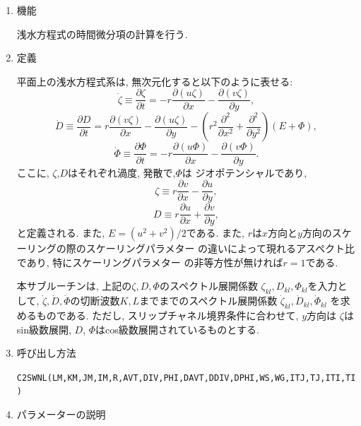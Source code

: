 \documentclass[a4j,fleqn]{jarticle}
\begin{document}
\begin{enumerate}

\item 機能 

浅水方程式の時間微分項の計算を行う.

\item 定義

平面上の浅水方程式系は, 無次元化すると以下のように表せる:
\begin{equation}
\dot{\zeta}\equiv\frac{\partial \zeta}{\partial t}
=-r\frac{\partial(u\zeta)}{\partial x}
 -\frac{\partial(v\zeta)}{\partial y},
\end{equation}
\begin{equation}
\dot{D}\equiv\frac{\partial D}{\partial t}
=r\frac{\partial(v\zeta)}{\partial x}
-\frac{\partial(u\zeta)}{\partial y}
 -\left(r^2\frac{\partial^2}{\partial x^2}
  +\frac{\partial^2}{\partial y^2}\right)(E+\Phi),
\end{equation}
\begin{equation}
\dot{\Phi}\equiv\frac{\partial \Phi}{\partial t}
=-r\frac{\partial(u\Phi)}{\partial x}
-\frac{\partial(v\Phi)}{\partial y}.
\end{equation}
ここに, 
$\zeta$,$D$はそれぞれ渦度, 発散で,$\Phi$は
ジオポテンシャルであり,
\begin{equation}
\zeta\equiv
r\frac{\partial v}{\partial x}
-\frac{\partial u}{\partial y},
\end{equation}
\begin{equation}
D\equiv
r\frac{\partial u}{\partial x}
+\frac{\partial v}{\partial y},
\end{equation}
と定義される. また, $E=(u^2+v^2)/2$である.
また, $r$は$x$方向と$y$方向のスケーリングの際のスケーリングパラメター
の違いによって現れるアスペクト比であり, 特にスケーリングパラメター
の非等方性が無ければ$r=1$である.

本サブルーチンは, 上記の$\zeta,D,\Phi$のスペクトル展開係数
$\zeta_{kl},D_{kl},\Phi_{kl}$を入力として,
$\dot{\zeta},\dot{D},\dot{\Phi}$の切断波数$K,L$までまでのスペクトル展開係数
$\dot{\zeta}_{kl},\dot{D}_{kl},\dot{\Phi}_{kl}$
を求めるものである.
ただし, スリップチャネル境界条件に合わせて, $y$方向は
$\zeta$はsin級数展開, $D$, $\Phi$はcos級数展開されているものとする.

\item 呼び出し方法 

{\tt C2SWNL(LM,KM,JM,IM,R,AVT,DIV,PHI,DAVT,DDIV,DPHI,WS,WG,ITJ,TJ,ITI,TI)}
  
\item パラメーターの説明


\end{enumerate}
\end{document}
